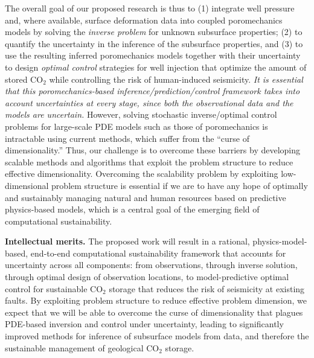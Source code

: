 \documentclass[11pt,final]{article}
\def\CO2{CO$_2$}
\begin{document}
The overall goal of our proposed research is thus to (1) integrate
well pressure and, where available, surface deformation data into
coupled poromechanics models by solving the {\em inverse problem} for
unknown subsurface properties; (2) to quantify the uncertainty in the
inference of the subsurface properties, and (3) to use the resulting
inferred poromechanics models together with their uncertainty to
design {\em optimal control} strategies for well injection that
optimize the amount of stored \CO2 while controlling the risk of
human-induced seismicity.  {\em It is essential that this
  poromechanics-based inference/prediction/control framework takes
  into account uncertainties at every stage, since both the
  observational data and the models are uncertain.} However, solving
stochastic inverse/optimal control problems for large-scale PDE models
such as those of poromechanics is intractable using current methods,
which suffer from the ``curse of dimensionality.''  Thus, our
challenge is to overcome these barriers by developing scalable methods
and algorithms that exploit the problem structure to reduce effective
dimensionality. Overcoming the scalability problem by exploiting
low-dimensional problem structure is essential if we are to have any
hope of optimally and sustainably managing natural and human resources
based on predictive physics-based models, which is a central goal of
the emerging field of computational sustainability.

{\bf Intellectual merits.}
%
The proposed work will result in a rational, physics-model-based,
end-to-end computational sustainability framework that accounts for
uncertainty across all components: from observations, through inverse
solution, through optimal design of observation locations, to
model-predictive optimal control for sustainable \CO2 storage that
reduces the risk of seismicity at existing faults. By exploiting
problem structure to reduce effective problem dimension, we expect
that we will be able to overcome the curse of dimensionality that
plagues PDE-based inversion and control under uncertainty, leading to
significantly improved methods for inference of subsurface models from
data, and therefore the sustainable management of geological \CO2
storage.
\end{document}
